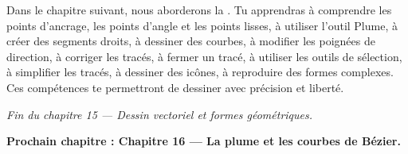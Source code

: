 Dans le chapitre suivant, nous aborderons la . Tu apprendras à comprendre les points d'ancrage, les points d'angle et les points lisses, à utiliser l'outil Plume, à créer des segments droits, à dessiner des courbes, à modifier les poignées de direction, à corriger les tracés, à fermer un tracé, à utiliser les outils de sélection, à simplifier les tracés, à dessiner des icônes, à reproduire des formes complexes. Ces compétences te permettront de dessiner avec précision et liberté.

\vspace{2em}

\begin{center}
\textit{Fin du chapitre 15 --- Dessin vectoriel et formes géométriques.}

\vspace{1em}

\textbf{Prochain chapitre : Chapitre 16 --- La plume et les courbes de Bézier.}
\end{center}